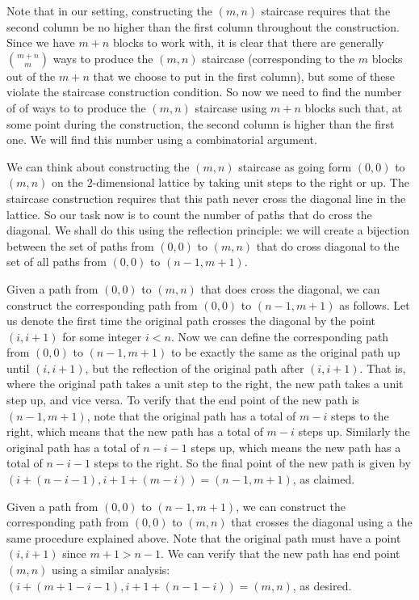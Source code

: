 \documentclass[12pt]{amsart}
\begin{document}
Note that in our setting, constructing the $(m,n)$ staircase requires that the second column be no higher than the first column throughout the construction. Since we have $m+n$ blocks to work with, it is clear that there are generally $\binom{m+n}{m}$ ways to produce the $(m,n)$ staircase (corresponding to the $m$ blocks out of the $m+n$ that we choose to put in the first column), but some of these violate the staircase construction condition. So now we need to find the number of of ways to to produce the $(m,n)$ staircase using $m+n$ blocks such that, at some point during the construction, the second column is higher than the first one. We will find this number using a combinatorial argument.

We can think about constructing the $(m,n)$ staircase as going form $(0,0)$ to $(m,n)$ on the $2$-dimensional lattice by taking unit steps to the right or up. The staircase construction requires that this path never cross the diagonal line in the lattice. So our task now is to count the number of paths that do cross the diagonal. We shall do this using the reflection principle: we will create a bijection between the set of paths from $(0,0)$ to $(m,n)$ that do cross diagonal to the set of all paths from $(0,0)$ to $(n-1,m+1)$.

Given a path from $(0,0)$ to $(m,n)$ that does cross the diagonal, we can construct the corresponding path from $(0,0)$ to $(n-1,m+1)$ as follows. Let us denote the first time the original path crosses the diagonal by the point $(i,i+1)$ for some integer $i < n$. Now we can define the corresponding path from $(0,0)$ to $(n-1,m+1)$ to be exactly the same as the original path up until $(i,i+1)$, but the reflection of the original path after $(i,i+1)$. That is, where the original path takes a unit step to the right, the new path takes a unit step up, and vice versa. To verify that the end point of the new path is $(n-1,m+1)$, note that the original path has a total of $m-i$ steps to the right, which means that the new path has a total of $m-i$ steps up. Similarly the original path has a total of $n-i-1$ steps up, which means the new path has a total of $n-i-1$ steps to the right. So the final point of the new path is given by $(i+(n-i-1), i+1+(m-i)) = (n-1,m+1)$, as claimed.

Given a path from $(0,0)$ to $(n-1,m+1)$, we can construct the corresponding path from $(0,0)$ to $(m,n)$ that crosses the diagonal using a the same procedure explained above. Note that the original path must have a point $(i,i+1)$ since $m+1>n-1$. We can verify that the new path has end point $(m,n)$ using a similar analysis: $(i+(m+1-i-1),i+1+(n-1-i)) = (m,n)$, as desired.
\end{document}
